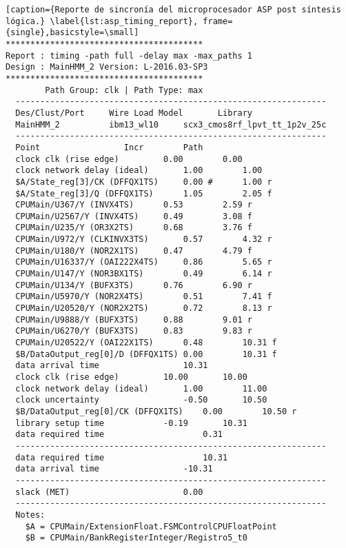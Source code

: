 \newpage

\begin{lstlisting}[caption={Reporte de sincronía del microprocesador ASP post síntesis lógica.} \label{lst:asp_timing_report}, frame={single},basicstyle=\small]
****************************************
Report : timing -path full -delay max -max_paths 1
Design : MainHMM_2 Version: L-2016.03-SP3
****************************************
		Path Group: clk | Path Type: max
  ---------------------------------------------------------------
  Des/Clust/Port     Wire Load Model       Library
  MainHMM_2          ibm13_wl10     scx3_cmos8rf_lpvt_tt_1p2v_25c
  ---------------------------------------------------------------
  Point					Incr		Path
  clock clk (rise edge)			0.00		0.00
  clock network delay (ideal)		1.00		1.00
  $A/State_reg[3]/CK (DFFQX1TS)		0.00 #		1.00 r
  $A/State_reg[3]/Q (DFFQX1TS)		1.05		2.05 f
  CPUMain/U367/Y (INVX4TS)		0.53		2.59 r
  CPUMain/U2567/Y (INVX4TS)		0.49		3.08 f
  CPUMain/U235/Y (OR3X2TS)		0.68		3.76 f
  CPUMain/U972/Y (CLKINVX3TS)		0.57		4.32 r
  CPUMain/U180/Y (NOR2X1TS)		0.47		4.79 f
  CPUMain/U16337/Y (OAI222X4TS)		0.86		5.65 r
  CPUMain/U147/Y (NOR3BX1TS)		0.49		6.14 r
  CPUMain/U134/Y (BUFX3TS)		0.76		6.90 r
  CPUMain/U5970/Y (NOR2X4TS)		0.51		7.41 f
  CPUMain/U20520/Y (NOR2X2TS)		0.72		8.13 r
  CPUMain/U9888/Y (BUFX3TS)		0.88		9.01 r
  CPUMain/U6270/Y (BUFX3TS)		0.83		9.83 r
  CPUMain/U20522/Y (OAI22X1TS)		0.48		10.31 f
  $B/DataOutput_reg[0]/D (DFFQX1TS)	0.00		10.31 f
  data arrival time					10.31
  clock clk (rise edge)			10.00		10.00
  clock network delay (ideal) 		1.00		11.00
  clock uncertainty           		-0.50		10.50
  $B/DataOutput_reg[0]/CK (DFFQX1TS)	0.00		10.50 r
  library setup time			-0.19		10.31
  data required time					0.31
  ---------------------------------------------------------------
  data required time					10.31
  data arrival time					-10.31
  ---------------------------------------------------------------
  slack (MET)						0.00
  ---------------------------------------------------------------
  Notes:
  	$A = CPUMain/ExtensionFloat.FSMControlCPUFloatPoint
  	$B = CPUMain/BankRegisterInteger/Registro5_t0
\end{lstlisting}

\newpage


